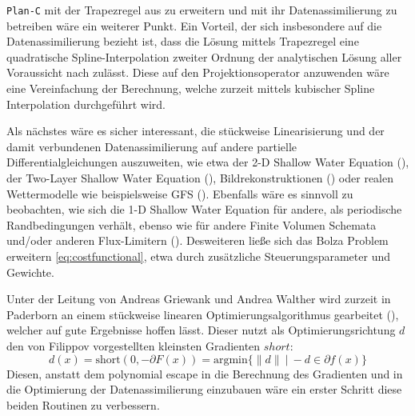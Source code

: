 \texttt{Plan-C} mit der Trapezregel aus \cite[S.23 (15)]{monster} zu erweitern und mit ihr Datenassimilierung zu betreiben wäre ein weiterer Punkt.
Ein Vorteil, der sich insbesondere auf die Datenassimilierung bezieht ist, dass die Lösung mittels Trapezregel eine quadratische Spline-Interpolation zweiter Ordnung der analytischen Lösung aller Voraussicht nach zulässt. Diese auf den Projektionsoperator anzuwenden wäre eine Vereinfachung der Berechnung, welche zurzeit mittels kubischer Spline Interpolation durchgeführt wird.

Als nächstes wäre es sicher interessant, die stückweise Linearisierung und der damit verbundenen Datenassimilierung auf andere partielle Differentialgleichungen auszuweiten, wie etwa der 2-D Shallow Water Equation (\cite[\S 3]{kurganov2007second}), der Two-Layer Shallow Water Equation (\cite{kurganov2009central}), Bildrekonstruktionen (\cite{korotaev2008retrieving}) oder realen Wettermodelle wie beispielsweise GFS (\cite{gfs}). 
Ebenfalls wäre es sinnvoll zu beobachten, wie sich die 1-D Shallow Water Equation für andere, als periodische Randbedingungen verhält, ebenso wie für andere Finite Volumen Schemata und/oder anderen Flux-Limitern (\cite{juntasaro2004comparative}).
Desweiteren ließe sich das Bolza Problem erweitern \eqref{eq:costfunctional}, etwa durch zusätzliche Steuerungsparameter und Gewichte. 

Unter der Leitung von Andreas Griewank und Andrea Walther wird zurzeit in Paderborn an einem stückweise linearen Optimierungsalgorithmus gearbeitet (\cite{griewank2014lipschitz}), welcher auf gute Ergebnisse hoffen lässt. 
Dieser nutzt als Optimierungsrichtung $d$ den von Filippov vorgestellten kleinsten Gradienten $short$:
\[
d(x) = \text{short}(0,-\partial F(x)) = \text{argmin} \lbrace \|d\| ~|~ -d \in \partial f(x) \rbrace
\]
Diesen, anstatt dem polynomial escape in die Berechnung des Gradienten und in die Optimierung der Datenassimilierung einzubauen wäre ein erster Schritt diese beiden Routinen zu verbessern.
